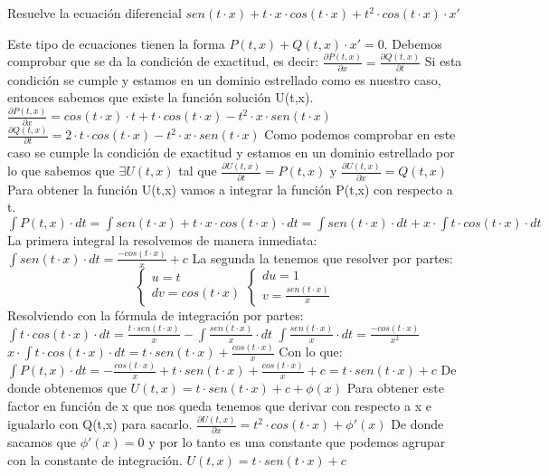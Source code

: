 \begin{ejer}
	Resuelve la ecuación diferencial $sen(t\cdot x) + t\cdot x\cdot cos(t\cdot x) + t^2\cdot cos(t\cdot x)\cdot x'$  
\end{ejer}
\begin{sol}
	Este tipo de ecuaciones tienen la forma $P(t,x) + Q(t,x)\cdot x' = 0$.  
	Debemos comprobar que se da la condición de exactitud, es decir:  
	$\frac{\partial P(t,x)}{\partial x} = \frac{\partial Q(t,x)}{\partial t}$  
	Si esta condición se cumple y estamos en un dominio estrellado como es nuestro caso, entonces sabemos que existe la función solución U(t,x).  
	$\frac{\partial P(t,x)}{\partial x} = cos(t\cdot x)\cdot t + t\cdot cos(t\cdot x) - t^2\cdot x\cdot sen(t\cdot x)$  
	$\frac{\partial Q(t,x)}{\partial t} = 2\cdot t\cdot cos(t\cdot x) - t^2\cdot x\cdot sen(t\cdot x)$  
	Como podemos comprobar en este caso se cumple la condición de exactitud y estamos en un dominio estrellado por lo que sabemos que $\exists U(t,x)$ tal que $\frac{\partial U(t,x)}{\partial t} = P(t,x)$ y $\frac{\partial U(t,x)}{\partial x} = Q(t,x)$  
	Para obtener la función U(t,x) vamos a integrar la función P(t,x) con respecto a t.  
	$\int P(t,x)\cdot dt = \int sen(t\cdot x) + t\cdot x\cdot cos(t\cdot x)\cdot dt = \int sen(t\cdot x)\cdot dt + x\cdot \int t\cdot cos(t\cdot x)\cdot dt$  
	La primera integral la resolvemos de manera inmediata:  
	$\int sen(t\cdot x)\cdot dt = \frac{-cos(t\cdot x)}{x} + c$  
	La segunda la tenemos que resolver por partes:  
	$$
	\begin{cases}
	u = t \\
	dv = cos(t\cdot x)
	\end{cases}
	\begin{cases}
	du = 1 \\
	v = \frac{sen(t\cdot x)}{x}
	\end{cases}
	$$  
	Resolviendo con la fórmula de integración por partes:  
	$\int t\cdot cos(t\cdot x)\cdot dt = \frac{t\cdot sen(t\cdot x)}{x}-\int \frac{sen(t\cdot x)}{x}\cdot dt$  
	$\int \frac{sen(t\cdot x)}{x}\cdot dt = \frac{-cos(t\cdot x)}{x^2}$  
	$x\cdot \int t\cdot cos(t\cdot x)\cdot dt = t\cdot sen(t\cdot x) + \frac{cos(t\cdot x)}{x}$  
	Con lo que:  
	$\int P(t,x)\cdot dt = -\frac{cos(t\cdot x)}{x} + t\cdot sen(t\cdot x) + \frac{cos(t\cdot x)}{x} + c = t\cdot sen(t\cdot x) + c$  
	De donde obtenemos que $U(t,x) = t\cdot sen(t\cdot x) + c + \phi (x)$  
	Para obtener este factor en función de x que nos queda tenemos que derivar con respecto a x e igualarlo con Q(t,x) para sacarlo.  
	$\frac{\partial U(t,x)}{\partial x} = t^2\cdot cos(t\cdot x) + \phi '(x)$  
	De donde sacamos que $\phi '(x) = 0$ y por lo tanto es una constante que podemos agrupar con la constante de integración.  
	$U(t,x) = t\cdot sen(t\cdot x) + c$
\end{sol}


